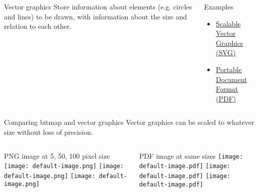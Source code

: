 \begin{frame}
	\begin{columns}[onlytextwidth]
		\begin{block}{Vector graphics}
			Store information about elements (e.g. circles and lines) to be drawn, with information
			about the size and relation to each other.
		\end{block}
		\begin{exampleblock}{Examples}
			\begin{itemize}
			\item \href{http://de.wikipedia.org/wiki/SVG}{Scalable Vector Graphics (SVG)}
			\item \href{http://de.wikipedia.org/wiki/Portable_Document_Format}{Portable	Document Format (PDF)}
			\end{itemize}
		\end{exampleblock}
	\end{columns}
\end{frame}

\begin{frame}
	\begin{block}{Comparing bitmap and vector graphics}
		Vector graphics can be scaled to whatever size without loss of
		precision.
	\end{block}

	\begin{columns}[onlytextwidth]
		\begin{exampleblock}{PNG image at 5, 50, 100 pixel size}
			\texttt{[image: default-image.png]}
			\texttt{[image: default-image.png]}
			\texttt{[image: default-image.png]}
		\end{exampleblock}
		\begin{exampleblock}{PDF image at same sizes}
			\texttt{[image: default-image.pdf]}
			\texttt{[image: default-image.pdf]}
			\texttt{[image: default-image.pdf]}
		\end{exampleblock}
	\end{columns}
\end{frame}
		
